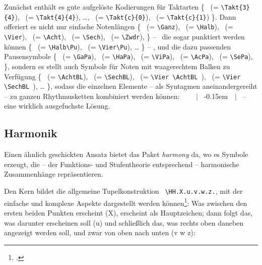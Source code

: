 Zunächst enthält es gute aufgelöste Kodierungen für Taktarten \{
 \ (= \texttt{\small \textbackslash{Takt}\{3\}\{4\}}),
 \ (= \texttt{\small \textbackslash{Takt}\{4\}\{4\}}),
\ldots,
 \ (= \texttt{\small \textbackslash{Takt}\{c\}\{0\}}),
 \ (= \texttt{\small \textbackslash{Takt}\{c\}\{1\}})
\}.
Dann offeriert es nicht nur einfache Notenlängen \{
\Ganz \ (= \texttt{\small \textbackslash{Ganz}}),
\Halb \ (= \texttt{\small \textbackslash{Halb}}),
\Vier \ (= \texttt{\small \textbackslash{Vier}}),
\Acht \ (= \texttt{\small \textbackslash{Acht}}),
\Sech \ (= \texttt{\small \textbackslash{Sech}}),
\Zwdr \ (= \texttt{\small \textbackslash{Zwdr}}),
\}  -- \ die sogar punktiert werden können
\{
\Halb\Pu \ (= \texttt{\small \textbackslash{Halb}\textbackslash{Pu}}),
\Vier\Pu \ (= \texttt{\small \textbackslash{Vier}\textbackslash{Pu}}),
\ldots
\}
-- , und die dazu passenden Pausensymbole
\{
\GaPa \ (= \texttt{\small \textbackslash{GaPa}}),
\HaPa \ (= \texttt{\small \textbackslash{HaPa}}),
\ViPa \ (= \texttt{\small \textbackslash{ViPa}}),
\AcPa \ (= \texttt{\small \textbackslash{AcPa}}),
\SePa \ (= \texttt{\small \textbackslash{SePa}}),
\},
sondern es stellt auch Symbole für Noten mit waagerechtem Balken zu Verfügung
\{
\AchtBL \ (= \texttt{\small \textbackslash{AchtBL}}),
\SechBL \ (= \texttt{\small \textbackslash{SechBL}}),
\Vier\AchtBL \ (= \texttt{\small \textbackslash{Vier} \textbackslash{AchtBL} }),
\Vier\SechBL \ (= \texttt{\small \textbackslash{Vier} \textbackslash{SechBL} }),
\ldots
\},
sodass die einzelnen Elemente -- als Syntagmen aneinandergereiht -- zu ganzen
Rhythmusketten kombiniert werden können:
 \Vier \ \Vier\AchtBL \ \Vier\Pu \ \Acht \ $|$ \AchtBR\Pu \SechBl \
\AchtBR\kern-0.15em\SechBR\Vier \ \SechBr\Vier\SechBl \ $|$ \ -- eine wirklich
ausgefuchste Lösung.

\subsection{\small Harmonik}

Einen ähnlich geschickten Ansatz bietet das Paket \textit{harmony} da, wo es
Symbole erzeugt, die -- der Funktions- und Stufentheorie entsprechend --
harmonische Zusammenhänge repräsentieren.

Den Kern bildet die allgemeine Tupelkonstruktion \texttt{\small
\textbackslash{HH.X.u.v.w.z.}}, mit der einfache und komplexe Aspekte
dargestellt werden können\footcite[vgl. dazu][2ff]{WegWeg2007a}: Was zwischen
den ersten beiden Punkten erscheint (X), erscheint als Hauptzeichen; dann folgt
das, was darunter erscheinen soll (u) und schließlich das, was rechts oben
daneben angezeigt werden soll, und zwar von oben nach unten (v w z):

